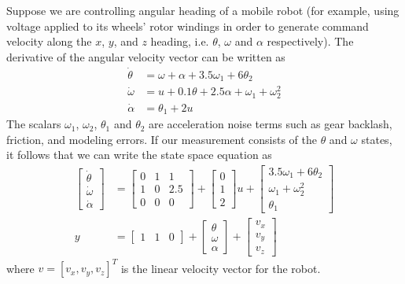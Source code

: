 \begin{example}
	Suppose we are controlling angular heading of a mobile robot (for example, using voltage applied to its wheels' rotor windings in order to generate command velocity along the $x$, $y$, and $z$ heading, i.e. $\theta$, $\omega$ and $\alpha$ respectively). The derivative of the angular velocity vector can be written as 
	\begin{align}
	\dot{\theta} &= \omega + \alpha + 3.5 \omega_1 + 6 \theta_2 \nonumber \\
	\dot{\omega} &= u + 0.1 \theta  + 2.5 \alpha + \omega_1 + \omega_2^2\nonumber \\
		\dot{\alpha} &= \theta_1 + 2 u %
	\end{align}
	The scalars $\omega_1$, $\omega_2$, $\theta_1$ and $\theta_2$ are acceleration noise terms such as gear backlash, friction, and modeling errors. If our measurement consists of the $\theta$ and $\omega$ states, it follows that we can write the state space equation as 
	\begin{align}
		\begin{bmatrix}
		 \dot{\theta} \\ \dot{\omega} \\ \dot{\alpha}
		\end{bmatrix}
		& =
		\begin{bmatrix}
		0 & 1 & 1 \\
		1 & 0 & 2.5 \\
		0 & 0 & 0
		\end{bmatrix}
		+
		\begin{bmatrix}
		0 \\ 1 \\ 2
		\end{bmatrix} u
		+
		\begin{bmatrix}
		 3.5 \omega_1 + 6 \theta_2 \\
		 \omega_1 + \omega_2^2 \\
		 \theta_1
		\end{bmatrix} \nonumber \\
		y &= \begin{bmatrix}
		1 & 1 & 0
		\end{bmatrix} +
		\begin{bmatrix}
		\theta \\ \omega \\ \alpha
		\end{bmatrix} + \begin{bmatrix}
		{v_x} \\ {v_y} \\ {v_z}
		\end{bmatrix}
	\end{align}
	where $v = [v_x, v_y, v_z]^T$ is the linear velocity vector for  the robot.
\end{example}

